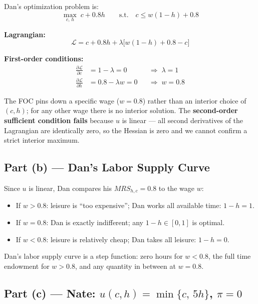 \documentclass[12pt]{article}
\begin{document}
Dan's optimization problem is:
\[
    \max_{c,\,h} \; c + 0.8h
    \qquad \text{s.t.} \quad c \leq w(1-h) + 0.8
\]

\textbf{Lagrangian:}
\[
    \mathcal{L} = c + 0.8h + \lambda\bigl[w(1-h) + 0.8 - c\bigr]
\]

\textbf{First-order conditions:}
\begin{align*}
    \frac{\partial \mathcal{L}}{\partial c} &= 1 - \lambda = 0
        &&\Longrightarrow\; \lambda = 1 \\[4pt]
    \frac{\partial \mathcal{L}}{\partial h} &= 0.8 - \lambda w = 0
        &&\Longrightarrow\; w = 0.8
\end{align*}

The FOC pins down a specific wage ($w = 0.8$) rather than an interior choice
of $(c,h)$; for any other wage there is no interior solution. The
\textbf{second-order sufficient condition fails} because $u$ is linear ---
all second derivatives of the Lagrangian are identically zero, so the Hessian
is zero and we cannot confirm a strict interior maximum.

\subsection*{Part (b) --- Dan's Labor Supply Curve}

Since $u$ is linear, Dan compares his $MRS_{h,c} = 0.8$ to the wage $w$:

\begin{itemize}[leftmargin=*]
    \item If $w > 0.8$: leisure is ``too expensive''; Dan works all available
    time: $1-h = 1$.
    \item If $w = 0.8$: Dan is exactly indifferent; any $1-h \in [0,1]$ is
    optimal.
    \item If $w < 0.8$: leisure is relatively cheap; Dan takes all leisure:
    $1-h = 0$.
\end{itemize}

Dan's labor supply curve is a step function: zero hours for $w < 0.8$, the
full time endowment for $w > 0.8$, and any quantity in between at $w = 0.8$.

\subsection*{Part (c) --- Nate: $u(c,h) = \min\{c,\,5h\}$, $\pi = 0$}
\end{document}
